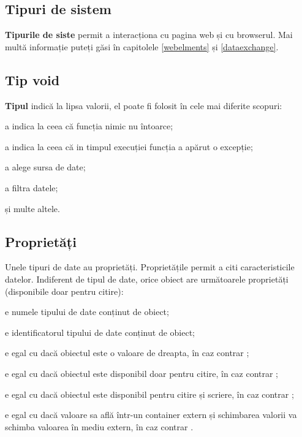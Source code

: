 \subsection{Tipuri de sistem}

{\bf Tipurile de siste} permit a interacționa cu pagina web și cu browserul. Mai multă informație puteți găsi în capitolele \ref{webelments} și \ref{dataexchange}.

\subsection{Tip {\color{lightblue} void}}

{\bf Tipul \void{}} indică la lipsa valorii, el poate fi folosit în cele mai diferite scopuri:

\begin{icItems}
\item
	a indica la ceea că funcția nimic nu întoarce;
\item
	a indica la ceea că in timpul execuției funcția a apărut o excepție;
\item
	a alege sursa de date;
\item
	a filtra datele;
\item
	și multe altele.
\end{icItems}


\subsection{Proprietăți}

Unele tipuri de date au proprietăți. Proprietățile permit a citi caracteristicile datelor. Indiferent de tipul de date, orice obiect are următoarele proprietăți (disponibile doar pentru citire):

\begin{icItems}
\item
	 e numele tipului de date conținut de obiect;
\item
	 e identificatorul tipului de date conținut de obiect;
\item
	 e egal cu \true{} dacă obiectul este o valoare de dreapta, în caz contrar \false{};
\item
	 e egal cu \true{} dacă obiectul este disponibil doar pentru citire, în caz contrar \false{};
\item
	 e egal cu \true{} dacă obiectul este disponibil pentru citire și scriere, în caz contrar \false{};
\item
	 e egal cu \true{} dacă valoare sa află într-un container extern și schimbarea valorii va schimba valoarea în mediu extern, în caz contrar \false{}.
\end{icItems}

